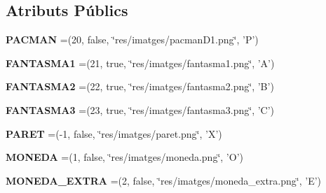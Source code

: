 \subsection*{Atributs Públics}
\begin{DoxyCompactItemize}
\item 
\hypertarget{enumlogica_1_1enumeracions_1_1_e_element_a983b49d3055700f77c186d12a0e36e01}{{\bfseries P\+A\+C\+M\+A\+N} =(20, false, \char`\"{}res/imatges/pacman\+D1.\+png\char`\"{}, 'P')}\label{enumlogica_1_1enumeracions_1_1_e_element_a983b49d3055700f77c186d12a0e36e01}

\item 
\hypertarget{enumlogica_1_1enumeracions_1_1_e_element_ab71df0523d6da54ef29a4c8cf034924d}{{\bfseries F\+A\+N\+T\+A\+S\+M\+A1} =(21, true, \char`\"{}res/imatges/fantasma1.\+png\char`\"{}, 'A')}\label{enumlogica_1_1enumeracions_1_1_e_element_ab71df0523d6da54ef29a4c8cf034924d}

\item 
\hypertarget{enumlogica_1_1enumeracions_1_1_e_element_a49cc18019e63517fed6b5b1494e360d1}{{\bfseries F\+A\+N\+T\+A\+S\+M\+A2} =(22, true, \char`\"{}res/imatges/fantasma2.\+png\char`\"{}, 'B')}\label{enumlogica_1_1enumeracions_1_1_e_element_a49cc18019e63517fed6b5b1494e360d1}

\item 
\hypertarget{enumlogica_1_1enumeracions_1_1_e_element_ae0551be2ee24b0da8219a637f85ea343}{{\bfseries F\+A\+N\+T\+A\+S\+M\+A3} =(23, true, \char`\"{}res/imatges/fantasma3.\+png\char`\"{}, 'C')}\label{enumlogica_1_1enumeracions_1_1_e_element_ae0551be2ee24b0da8219a637f85ea343}

\item 
\hypertarget{enumlogica_1_1enumeracions_1_1_e_element_a34ee6e54a3e9a7fcbefb0b263b3cafdc}{{\bfseries P\+A\+R\+E\+T} =(-\/1, false, \char`\"{}res/imatges/paret.\+png\char`\"{}, 'X')}\label{enumlogica_1_1enumeracions_1_1_e_element_a34ee6e54a3e9a7fcbefb0b263b3cafdc}

\item 
\hypertarget{enumlogica_1_1enumeracions_1_1_e_element_ab3c6802b93ac6841b6b7d060f8a1658d}{{\bfseries M\+O\+N\+E\+D\+A} =(1, false, \char`\"{}res/imatges/moneda.\+png\char`\"{}, 'O')}\label{enumlogica_1_1enumeracions_1_1_e_element_ab3c6802b93ac6841b6b7d060f8a1658d}

\item 
\hypertarget{enumlogica_1_1enumeracions_1_1_e_element_a17b4a575b6810c535861bf2166a95478}{{\bfseries M\+O\+N\+E\+D\+A\+\_\+\+E\+X\+T\+R\+A} =(2, false, \char`\"{}res/imatges/moneda\+\_\+extra.\+png\char`\"{}, 'E')}\label{enumlogica_1_1enumeracions_1_1_e_element_a17b4a575b6810c535861bf2166a95478}


\end{DoxyCompactItemize}
